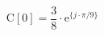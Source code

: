 \begin{center}
\[
\textrm{C}[0] = \frac{3}{8} \cdot \textrm{e}^{\{ j \cdot \pi/9 \}}
\]
\end{center}
